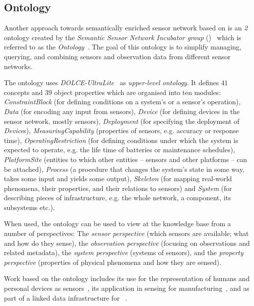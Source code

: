 \vspace{1em}

\subsection{ Ontology}
\label{subsec:onto2}

Another approach towards semantically enriched sensor network based on  is an \emph{ 2} ontology created by the \emph{ Semantic Sensor Network Incubator group} ()~\cite{SSN-XG} which is referred to as the \emph{ Ontology}~\cite{ssn_ontology}. The goal of this ontology is to simplify managing, querying, and combining sensors and observation data from different sensor networks. 

The  ontology uses \emph{DOLCE-UltraLite}~\cite{dul} as \emph{upper-level ontology}. It defines $41$ concepts and $39$ object properties which are organised into ten modules: \emph{ConstraintBlock} (for defining conditions on a system's or a sensor's operation), \emph{Data} (for encoding any input from sensors), \emph{Device} (for defining devices in the sensor network, mostly sensors), \emph{Deployment} (for specifying the deployment of \emph{Device}s), \emph{MeasuringCapability} (properties of sensors, e.g. accuracy or response time), \emph{OperatingRestriction} (for defining conditions under which the system is expected to operate, e.g. the life time of batteries or maintenance schedules), \emph{PlatformSite} (entities to which other entities -- sensors and other platforms -- can be attached), \emph{Process} (a procedure that changes the system's state in some way, takes some input and yields some output), \emph{Skeleton} (for mapping real-world phenomena, their properties, and their relations to sensors) and \emph{System} (for describing pieces of infrastructure, e.g. the whole network, a component, its subsystems etc.).

When used, the ontology can be used to view at the knowledge base from a number of perspectives: The \emph{sensor perspective} (which sensors are available; what and how do they sense), the \emph{observation perspective} (focusing on observations and related metadata), the \emph{system perspective} (systems of sensors), and the \emph{property perspective} (properties of physical phenomena and how they are sensed).

Work based on the  ontology includes its use for the representation of humans and personal devices as sensors~\cite{ssn_example1}, its application in sensing for manufacturing~\cite{ssn_example2}, and as part of a linked data infrastructure for ~\cite{ssn_example3}.


